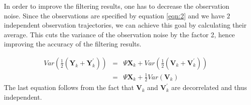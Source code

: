 \documentclass[a4paper, 12pt, titlepage]{article}
\begin{document}
In order to improve the filtering results, one has to decrease the observation noise. 
Since the observations are specified by equation \eqref{eqn:2} and we have $2$ independent observation trajectories, we can achieve this goal by calculating their average.
This cuts the variance of the observation noise by the factor 2, hence improving the accuracy of the filtering results.

\begin{eqnarray}
	Var \left( \frac{1}{2}(\pmb{Y}_k+\pmb{Y}^{\prime}_k) \right)&=& \Psi\pmb{X}_k + Var \left( \frac{1}{2} (\pmb{V}_k + \pmb{V}^{\prime}_k )\right)\\
	&=& \Psi\pmb{X}_k + \frac{1}{2} Var\left(\pmb{V}_k \right)
\end{eqnarray}
The last equation follows from the fact that $\pmb{V}_k$ and $\pmb{V}^{\prime}_k$ are decorrelated and thus independent.
\end{document}
